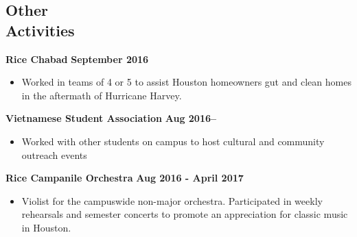 \documentclass[margin,line]{resume}
\begin{document}
\begin{resume}
    \section{\mysidestyle Other\\ Activities}
    \textbf{Rice Chabad} \hfill \textbf{September 2016}
    \begin{itemize}
    \item Worked in teams of 4 or 5 to assist Houston homeowners gut and clean homes in the aftermath of Hurricane Harvey.
    \end{itemize}
    \vspace{-3mm}
    \textbf{Vietnamese Student Association} \hfill \textbf{Aug 2016--}
    \begin{itemize}
    \item Worked with other students on campus to host cultural and community outreach events
    \end{itemize}
    \vspace{-3mm}
    \textbf{Rice Campanile Orchestra} \hfill \textbf{Aug 2016 - April 2017}
    \begin{itemize}
    \item Violist for the campuswide non-major orchestra.
    Participated in weekly rehearsals and semester concerts to promote an appreciation for classic music in Houston.
    \end{itemize}




\end{resume}
\end{document}
